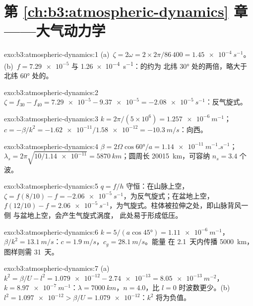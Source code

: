\section*{第 \ref{ch:b3:atmospheric-dynamics} 章——大气动力学}

\begin{solution}{exo:b3:atmospheric-dynamics:1}
(a)~$\zeta = 2\omega = 2\times2\pi/86\,400 = \qty{1.45e-4}{s^{-1}}$。
(b)~$f = \num{7.29e-5}$ 与 \qty{1.26e-4}{s^{-1}}：的约为
北纬 \ang{30} 处的两倍，略大于
北纬 \ang{60} 处的。
\end{solution}

\begin{solution}{exo:b3:atmospheric-dynamics:2}
$\zeta = f_{30} - f_{40} = \num{7.29e-5} - \num{9.37e-5} =
\qty{-2.08e-5}{s^{-1}}$：反气旋式。
\end{solution}

\begin{solution}{exo:b3:atmospheric-dynamics:3}
$k = 2\pi/(5\times10^6) = \qty{1.257e-6}{m^{-1}}$；$c = -\beta/k^2 =
-\num{1.62e-11}/\num{1.58e-12} = \qty{-10.3}{m/s}$：向西。
\end{solution}

\begin{solution}{exo:b3:atmospheric-dynamics:4}
$\beta = 2\Omega\cos\ang{60}/a = \qty{1.14e-11}{m^{-1}.s^{-1}}$；
$\lambda_s = 2\pi\sqrt{10/\num{1.14e-11}} = \qty{5870}{km}$；圆周长
\qty{20015}{km}，可容纳 $n_s = 3.4$ 个波。
\end{solution}

\begin{solution}{exo:b3:atmospheric-dynamics:5}
$q = f/h$ 守恒：在山脉上空，$\zeta = f(8/10) - f =
\qty{-2.06e-5}{s^{-1}}$，为反气旋式；在盆地上空，$f(12/10) - f =
\qty{+2.06e-5}{s^{-1}}$，为气旋式。柱体被拉伸之处，即山脉背风一侧
与盆地上空，会产生气旋式涡度，
此处易于形成低压。
\end{solution}

\begin{solution}{exo:b3:atmospheric-dynamics:6}
$k = 5/(a\cos\ang{45}) = \qty{1.11e-6}{m^{-1}}$，$\beta/k^2 =
\qty{13.1}{m/s}$：$c = \qty{1.9}{m/s}$，$c_g = \qty{28.1}{m/s}$。能量
在 \num{2.1}~天内传播 \qty{5000}{km}，图样则需 \num{31}~天。
\end{solution}

\begin{solution}{exo:b3:atmospheric-dynamics:7}
(a)~$k^2 = \beta/U - l^2 = \num{1.079e-12} - \num{2.74e-13} =
\qty{8.05e-13}{m^{-2}}$，$k = \qty{8.97e-7}{m^{-1}}$：$\lambda =
\qty{7000}{km}$，$n = 4.0$，比 $l = 0$ 时波数更少。(b)~$l^2 =
\num{1.097e-12} > \beta/U = \num{1.079e-12}$：$k^2$ 将为负值。
\end{solution}

